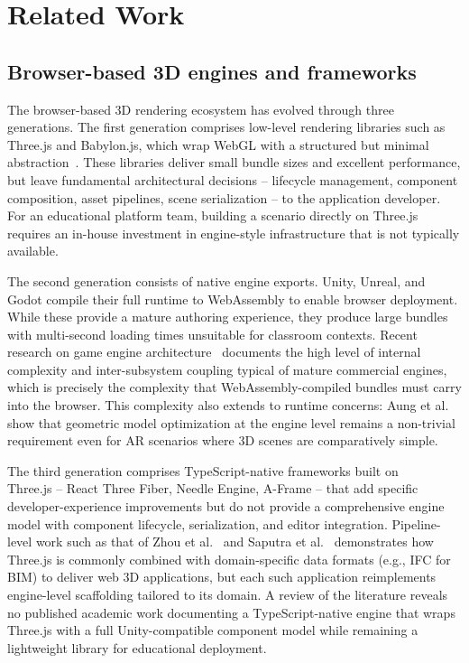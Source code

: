 \section{Related Work}

\subsection{Browser-based 3D engines and frameworks}
The browser-based 3D rendering ecosystem has evolved through three generations. The first generation comprises low-level rendering libraries such as Three.js and Babylon.js, which wrap WebGL with a structured but minimal abstraction~\cite{Evans2014}. These libraries deliver small bundle sizes and excellent performance, but leave fundamental architectural decisions -- lifecycle management, component composition, asset pipelines, scene serialization -- to the application developer. For an educational platform team, building a scenario directly on Three.js requires an in-house investment in engine-style infrastructure that is not typically available.

The second generation consists of native engine exports. Unity, Unreal, and Godot compile their full runtime to WebAssembly to enable browser deployment. While these provide a mature authoring experience, they produce large bundles with multi-second loading times unsuitable for classroom contexts. Recent research on game engine architecture~\cite{Ullmann2025} documents the high level of internal complexity and inter-subsystem coupling typical of mature commercial engines, which is precisely the complexity that WebAssembly-compiled bundles must carry into the browser. This complexity also extends to runtime concerns: Aung et al.~\cite{Aung2022} show that geometric model optimization at the engine level remains a non-trivial requirement even for AR scenarios where 3D scenes are comparatively simple.

The third generation comprises TypeScript-native frameworks built on \\Three.js -- React Three Fiber, Needle Engine, A-Frame -- that add specific developer-experience improvements but do not provide a comprehensive engine model with component lifecycle, serialization, and editor integration. Pipeline-level work such as that of Zhou et al.~\cite{Zhou2018} and Saputra et al.~\cite{IMadeSuryaKumara2024} demonstrates how Three.js is commonly combined with domain-specific data formats (e.g., IFC for BIM) to deliver web 3D applications, but each such application reimplements engine-level scaffolding tailored to its domain. A review of the literature reveals no published academic work documenting a TypeScript-native engine that wraps Three.js with a full Unity-compatible component model while remaining a lightweight library for educational deployment.

